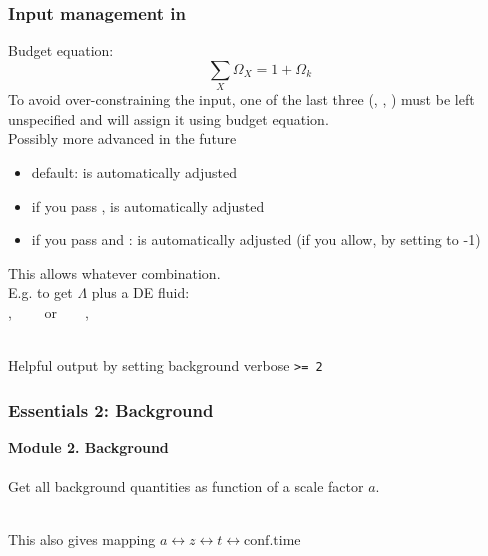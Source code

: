 \begin{frame}[fragile]
	\frametitle{Input management in {\Red \CLASS{}}}
	
	{\Red Budget equation:}
	$$
	\sum_X \Omega_X = 1 + \Omega_k
	$$
	To avoid over-constraining the input, one of the last three (, , ) must be left unspecified and  {\Red \CLASS{}} will assign it using budget equation.\\
	{\tiny Possibly more advanced in the future} 
	\begin{itemize}
		\item default:  is automatically adjusted
		\item if you pass ,    is automatically adjusted
		\item if you pass  and :  is automatically adjusted (if you allow, by setting to -1)
	\end{itemize}
	This allows whatever combination.\\
	E.g. to get $\Lambda$ plus a DE fluid: \\
	, ~~~~or~~~~, 
	
	\mbox{}\\
	Helpful output by setting background verbose \texttt{\textgreater= 2}
\end{frame}




\begin{frame}[fragile]
\frametitle{Essentials 2: Background}

{\bf Module 2. Background}\\
\mbox{}\\
Get all background quantities as function of a scale factor $a$.



\mbox{}\\
This also gives mapping $a \leftrightarrow z \leftrightarrow t \leftrightarrow \mathrm{conf. time}$\\

\end{frame}

